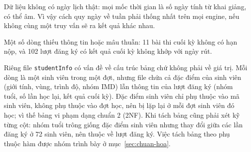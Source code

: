Dữ liệu không có ngày lịch thật: mọi mốc thời gian là số ngày tính từ khai giảng, có thể
âm. Vì vậy cách quy ngày về tuần phải thống nhất trên mọi engine, nếu không cùng một truy
vấn sẽ ra kết quả khác nhau.

Một số dòng thiếu thông tin hoặc mâu thuẫn: 11 bài thi cuối kỳ không có hạn nộp, và 102
lượt đăng ký có kết quả cuối kỳ không khớp với ngày rút.

Riêng file \texttt{studentInfo} có vấn đề về cấu trúc bảng chứ không phải về giá trị. Mỗi
dòng là một sinh viên trong một đợt, nhưng file chứa cả đặc điểm của sinh viên (giới tính,
vùng, trình độ, nhóm IMD) lẫn thông tin của lượt đăng ký (nhóm tuổi, số lần học lại, kết
quả cuối kỳ). Đặc điểm sinh viên chỉ phụ thuộc vào mã sinh viên, không phụ thuộc vào đợt học, nên bị lặp lại ở mỗi đợt sinh viên đó học; vì thế bảng vi phạm dạng chuẩn 2 (2NF). Khi tách bảng
cũng phải xét kỹ từng cột: nhóm tuổi trông giống đặc điểm sinh viên nhưng thay đổi giữa các lần đăng ký ở 72 sinh viên, nên thuộc về lượt đăng ký. Việc tách bảng theo phụ thuộc hàm được nhóm trình bày ở mục~\ref{sec:chuan-hoa}.
